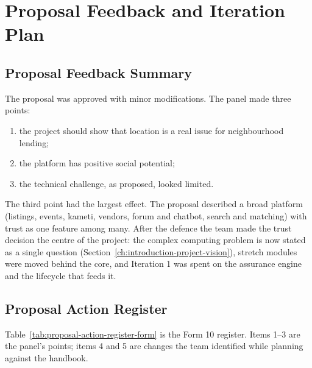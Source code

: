 \chapter{Proposal Feedback and Iteration Plan}\label{ch:proposal-feedback-iteration}
\section{Proposal Feedback Summary}\label{sec:proposal-feedback-summary}
The proposal was approved with minor modifications. The panel made three points:

\begin{enumerate}
\item the project should show that location is a real issue for neighbourhood lending;
\item the platform has positive social potential;
\item the technical challenge, as proposed, looked limited.
\end{enumerate}

The third point had the largest effect. The proposal described a broad platform (listings, events, kameti, vendors, forum and chatbot, search and matching) with trust as one feature among many. After the defence the team made the trust decision the centre of the project: the complex computing problem is now stated as a single question (Section~\ref{ch:introduction-project-vision}), stretch modules were moved behind the core, and Iteration 1 was spent on the assurance engine and the lifecycle that feeds it.

\section{Proposal Action Register}\label{sec:proposal-action-register}
Table~\ref{tab:proposal-action-register-form} is the Form 10 register. Items 1--3 are the panel's points; items 4 and 5 are changes the team identified while planning against the handbook.

